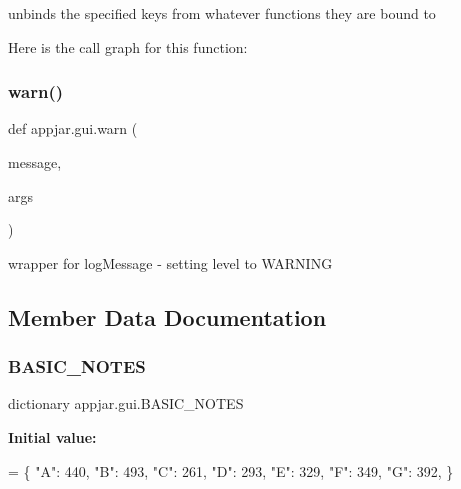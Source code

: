 \begin{DoxyVerb}
\begin{DoxyVerb}unbinds the specified keys from whatever functions they are bound to \end{DoxyVerb}
 Here is the call graph for this function\+:
\mbox{\label{classappjar_1_1gui_a3ab0139430263b1913b4078cf34e7098}} 
\subsubsection{\texorpdfstring{warn()}{warn()}}
{\footnotesize\ttfamily def appjar.\+gui.\+warn (\begin{DoxyParamCaption}\item[{}]{message,  }\item[{}]{args }\end{DoxyParamCaption})\hspace{0.3cm}{\ttfamily [static]}}

\begin{DoxyVerb}wrapper for logMessage - setting level to WARNING \end{DoxyVerb}
 

\subsection{Member Data Documentation}
\mbox{\label{classappjar_1_1gui_a97f9c9e837b04c0601f2a158913aaa9c}} 
\subsubsection{\texorpdfstring{B\+A\+S\+I\+C\+\_\+\+N\+O\+T\+ES}{BASIC\_NOTES}}
{\footnotesize\ttfamily dictionary appjar.\+gui.\+B\+A\+S\+I\+C\+\_\+\+N\+O\+T\+ES\hspace{0.3cm}{\ttfamily [static]}}

{\bfseries Initial value\+:}
\begin{DoxyCode}
=  \{
        \textcolor{stringliteral}{"A"}: 440,
        \textcolor{stringliteral}{"B"}: 493,
        \textcolor{stringliteral}{"C"}: 261,
        \textcolor{stringliteral}{"D"}: 293,
        \textcolor{stringliteral}{"E"}: 329,
        \textcolor{stringliteral}{"F"}: 349,
        \textcolor{stringliteral}{"G"}: 392,
    \}
\end{DoxyCode}



\end{DoxyVerb}
